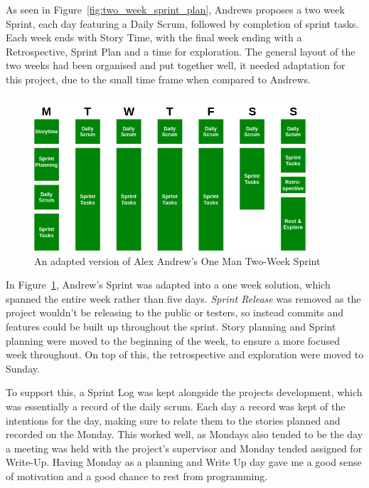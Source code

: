 \documentclass[a4paper,10pt]{report}
\begin{document}
As seen in Figure~\ref{fig:two_week_sprint_plan}, Andrews proposes a two week Sprint, each day featuring a Daily Scrum, followed by completion of sprint tasks. Each week ends with Story Time, with the final week ending with a Retrospective, Sprint Plan and a time for exploration. The general layout of the two weeks had been organised and put together well, it needed adaptation for this project, due to the small time frame when compared to Andrews. \medskip

\begin{figure}[h!]
    \centering
  \includegraphics[width=0.9\textwidth]{Sprint_Plan}
 \caption{An adapted version of Alex Andrew's One Man Two-Week Sprint}
 \label{fig:one_week_sprint_plan}
\end{figure}

In Figure~\ref{fig:one_week_sprint_plan}, Andrew's Sprint was adapted into a one week solution, which spanned the entire week rather than five days. \textit{Sprint Release} was removed as the project wouldn't be releasing to the public or testers, so instead commits and features could be built up throughout the sprint. Story planning and Sprint planning were moved to the beginning of the week, to ensure a more focused week throughout. On top of this, the retrospective and exploration were moved to Sunday. \medskip

To support this, a Sprint Log was kept alongside the projects development, which was essentially a record of the daily scrum. Each day a record was kept of the intentions for the day, making sure to relate them to the stories planned and recorded on the Monday. This worked well, as Mondays also tended to be the day a meeting was held with the project's supervisor and Monday tended assigned for Write-Up. Having Monday as a planning and Write Up day gave me a good sense of motivation and a good chance to rest from programming. \medskip
\end{document}
